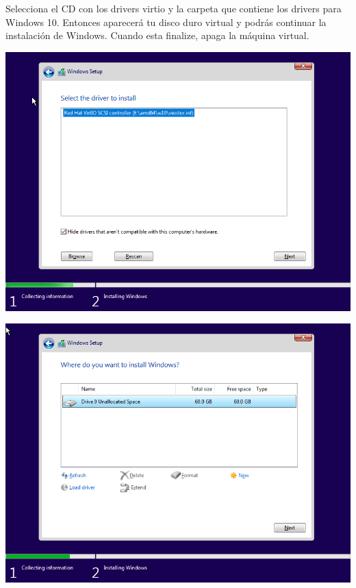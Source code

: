 \documentclass[12pt]{article}
\begin{document}
Selecciona el CD con los drivers virtio y la carpeta que contiene los drivers para Windows 10. Entonces aparecerá tu disco duro virtual y podrás continuar la instalación de Windows. Cuando esta finalize, apaga la máquina virtual.

\begin{multicols}{2}
\begin{minipage}[t]{\linewidth}%
\vspace{0pt}
\centering
\includegraphics[width=\textwidth]{assets/Screenshot_win10-91.png}
\end{minipage}
\begin{minipage}[t]{\linewidth}%
\vspace{0pt}
\centering
\includegraphics[width=\textwidth]{assets/Screenshot_win10-92.png}
\end{minipage}
\end{multicols}
\end{document}
